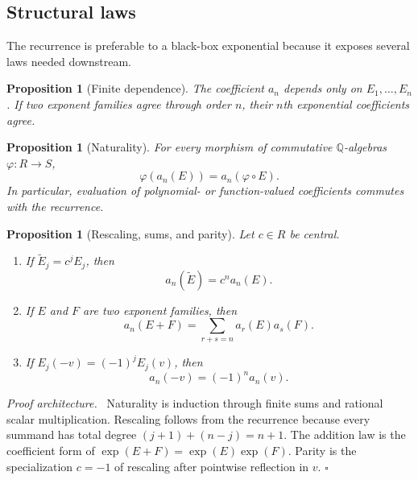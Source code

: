 \documentclass[11pt,oneside]{article}
\newtheorem{proposition}[theorem]{Proposition}
\theoremstyle{definition}
\theoremstyle{remark}
\newcommand{\Q}{\mathbb Q}
\newenvironment{proofidea}{\par\smallskip\noindent\textit{Proof architecture.}\ }{\hfill$\square$\par\smallskip}
\begin{document}
\subsection{Structural laws}

The recurrence is preferable to a black-box exponential because it exposes several laws
needed downstream.

\begin{proposition}[Finite dependence]
\label{prop:expcoeff-finite-dependence}
The coefficient $a_n$ depends only on $E_1,\ldots,E_n$.  If two exponent families agree
through order $n$, their $n$th exponential coefficients agree.
\end{proposition}

\begin{proposition}[Naturality]
\label{prop:expcoeff-naturality}
For every morphism of commutative $\Q$-algebras $\varphi:R\to S$,
\begin{equation}
 \varphi(a_n(E))=a_n(\varphi\circ E).
 \label{eq:expcoeff-map}
\end{equation}
In particular, evaluation of polynomial- or function-valued coefficients commutes with the
recurrence.
\end{proposition}

\begin{proposition}[Rescaling, sums, and parity]
\label{prop:expcoeff-structure}
Let $c\in R$ be central.
\begin{enumerate}
 \item If $\widetilde E_j=c^jE_j$, then
 \begin{equation}
  a_n(\widetilde E)=c^na_n(E).
  \label{eq:expcoeff-rescale}
 \end{equation}
 \item If $E$ and $F$ are two exponent families, then
 \begin{equation}
  a_n(E+F)=\sum_{r+s=n}a_r(E)a_s(F).
  \label{eq:expcoeff-add-convolution}
 \end{equation}
 \item If $E_j(-v)=(-1)^jE_j(v)$, then
 \begin{equation}
  a_n(-v)=(-1)^na_n(v).
  \label{eq:expcoeff-parity}
 \end{equation}
\end{enumerate}
\end{proposition}

\begin{proofidea}
Naturality is induction through finite sums and rational scalar multiplication.
Rescaling follows from the recurrence because every summand has total degree
$(j+1)+(n-j)=n+1$.  The addition law is the coefficient form of
$\exp(E+F)=\exp(E)\exp(F)$.  Parity is the specialization $c=-1$ of rescaling after
pointwise reflection in $v$.
\end{proofidea}
\end{document}
